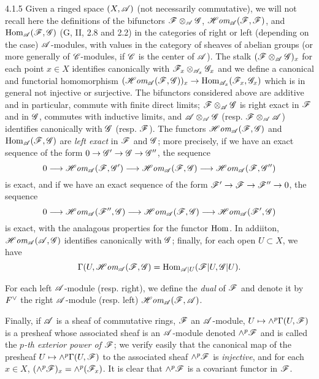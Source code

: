 \documentclass[10pt,oneside]{book}
\begin{document}
\begin{env}{4.1.5}
\label{env-0.4.1.5}
Given a ringed space $(X,\mathscr{A})$ (not necessarily commutative), we will not recall here the
definitions of the bifunctors $\mathscr{F}\otimes_\mathscr{A}\mathscr{G}$,
$\mathscr{H}\textit{om}_\mathscr{A}(\mathscr{F},\mathscr{F})$, and ${\mathop{\mathrm{Hom}}\nolimits}_\mathscr{A}(\mathscr{F},\mathscr{G})$ (G, II, 2.8 and 2.2) in
the categories of right or left (depending on the case) $\mathscr{A}$-modules, with values in the
category of sheaves of abelian groups (or more generally of $\mathscr{C}$-modules, if $\mathscr{C}$ is
the center of $\mathscr{A}$). The stalk $(\mathscr{F}\otimes_\mathscr{A}\mathscr{G})_x$ for each point $x\in X$
identifies canonically with $\mathscr{F}_x\otimes_{\mathscr{A}_x}\mathscr{G}_x$ and we define a canonical
and functorial homomorphism
$(\mathscr{H}\textit{om}_\mathscr{A}(\mathscr{F},\mathscr{G}))_x\to{\mathop{\mathrm{Hom}}\nolimits}_{\mathscr{A}_x}(\mathscr{F}_x,\mathscr{G}_x)$ which is in general
not injective or surjective. The bifunctors considered above are additive and in particular,
commute with finite direct limits; $\mathscr{F}\otimes_\mathscr{A}\mathscr{G}$ is right exact in $\mathscr{F}$
and in $\mathscr{G}$, commutes with inductive limits, and $\mathscr{A}\otimes_\mathscr{A}\mathscr{G}$ (resp.
$\mathscr{F}\otimes_\mathscr{A}\mathscr{A}$) identifies canonically with $\mathscr{G}$ (resp. $\mathscr{F}$). The
functors $\mathscr{H}\textit{om}_\mathscr{A}(\mathscr{F},\mathscr{G})$ and ${\mathop{\mathrm{Hom}}\nolimits}_\mathscr{A}(\mathscr{F},\mathscr{G})$ are \emph{left
exact} in $\mathscr{F}$ and $\mathscr{G}$; more precisely, if we have an exact sequence of the form
$0\to\mathscr{G}'\to\mathscr{G}\to\mathscr{G}''$, the sequence
\[
  0\longrightarrow\mathscr{H}\textit{om}_\mathscr{A}(\mathscr{F},\mathscr{G}')\longrightarrow
  \mathscr{H}\textit{om}_\mathscr{A}(\mathscr{F},\mathscr{G})\longrightarrow\mathscr{H}\textit{om}_\mathscr{A}(\mathscr{F},\mathscr{G}'')
\]
is exact, and if we have an exact sequence of the form $\mathscr{F}'\to\mathscr{F}\to\mathscr{F}''\to 0$,
the sequence
\[
  0\longrightarrow\mathscr{H}\textit{om}_\mathscr{A}(\mathscr{F}'',\mathscr{G})\longrightarrow
  \mathscr{H}\textit{om}_\mathscr{A}(\mathscr{F},\mathscr{G})\longrightarrow\mathscr{H}\textit{om}_\mathscr{A}(\mathscr{F}',\mathscr{G})
\]
is exact, with the analagous properties for the functor ${\mathop{\mathrm{Hom}}\nolimits}$. In addiiton,
$\mathscr{H}\textit{om}_\mathscr{A}(\mathscr{A},\mathscr{G})$ identifies canonically with $\mathscr{G}$; finally, for each open
$U\subset X$, we have
\[
  \Gamma(U,\mathscr{H}\textit{om}_\mathscr{A}(\mathscr{F},\mathscr{G})={\mathop{\mathrm{Hom}}\nolimits}_{\mathscr{A}|U}(\mathscr{F}|U,\mathscr{G}|U).
\]

For each left $\mathscr{A}$-module (resp. right), we define the \emph{dual} of $\mathscr{F}$ and
denote it by ${F}^\vee$ the right $\mathscr{A}$-module (resp. left)
$\mathscr{H}\textit{om}_\mathscr{A}(\mathscr{F},\mathscr{A})$.

Finally, if $\mathscr{A}$ is a sheaf of commutative rings, $\mathscr{F}$ an $\mathscr{A}$-module,
$U\mapsto\wedge^p\Gamma(U,\mathscr{F})$ is a presheaf whose associated sheaf is an $\mathscr{A}$-module
denoted $\wedge^p\mathscr{F}$ and is called the \emph{$p$-th exterior power of $\mathscr{F}$}; we
verify easily that the canonical map of the presheaf $U\mapsto\wedge^p\Gamma(U,\mathscr{F})$ to
the associated sheaf $\wedge^p\mathscr{F}$ is \emph{injective}, and for each $x\in X$,
$(\wedge^p\mathscr{F})_x=\wedge^p(\mathscr{F}_x)$. It is clear that $\wedge^p\mathscr{F}$ is a covariant
functor in $\mathscr{F}$.
\end{env}
\end{document}
